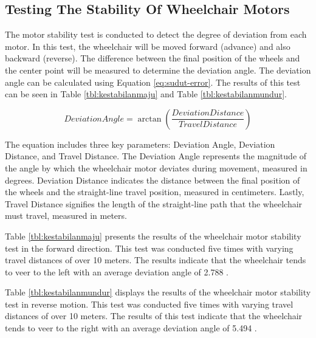   \subsection{Testing The Stability Of Wheelchair Motors}

  The motor stability test is conducted to detect the degree of deviation from each motor. In this test, the wheelchair will be moved forward (advance) and also backward (reverse). The difference between the final position of the wheels and the center point will be measured to determine the deviation angle. The deviation angle can be calculated using Equation \ref{eq:sudut-error}. The results of this test can be seen in Table \ref{tbl:kestabilanmaju} and Table \ref{tbl:kestabilanmundur}.

\begin{equation}
  \label{eq:sudut-error}
  Deviation Angle = \arctan \left ( \frac{Deviation Distance}{Travel Distance} \right )
\end{equation}

The equation includes three key parameters: Deviation Angle, Deviation Distance, and Travel Distance. The Deviation Angle represents the magnitude of the angle by which the wheelchair motor deviates during movement, measured in degrees. Deviation Distance indicates the distance between the final position of the wheels and the straight-line travel position, measured in centimeters. Lastly, Travel Distance signifies the length of the straight-line path that the wheelchair must travel, measured in meters.

Table \ref{tbl:kestabilanmaju} presents the results of the wheelchair motor stability test in the forward direction. This test was conducted five times with varying travel distances of over 10 meters. The results indicate that the wheelchair tends to veer to the left with an average deviation angle of 2.788 \textdegree.

Table \ref{tbl:kestabilanmundur} displays the results of the wheelchair motor stability test in reverse motion. This test was conducted five times with varying travel distances of over 10 meters. The results of this test indicate that the wheelchair tends to veer to the right with an average deviation angle of 5.494 \textdegree.

